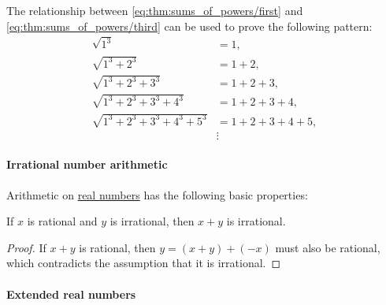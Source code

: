 \begin{example}\label{ex:sqrt_of_cubes}
  The relationship between \eqref{eq:thm:sums_of_powers/first} and \eqref{eq:thm:sums_of_powers/third} can be used to prove the following pattern:
  \begin{align*}
    \sqrt{ 1^3 }                               &= 1, \\
    \sqrt{ 1^3 + 2^3 }                         &= 1 + 2, \\
    \sqrt{ 1^3 + 2^3 + 3^3 }                   &= 1 + 2 + 3, \\
    \sqrt{ 1^3 + 2^3 + 3^3 + 4^3 }             &= 1 + 2 + 3 + 4, \\
    \sqrt{ 1^3 + 2^3 + 3^3 + 4^3 + 5^3 }       &= 1 + 2 + 3 + 4 + 5, \\
                                               &\vdots
  \end{align*}
\end{example}

\paragraph{Irrational number arithmetic}

\begin{proposition}\label{thm:real_number_arithmetic}
  Arithmetic on \hyperref[def:real_numbers]{real numbers} has the following basic properties:
  \begin{thmenum}
     If \( x \) is rational and \( y \) is irrational, then \( x + y \) is irrational.
  \end{thmenum}
\end{proposition}
\begin{proof}
   If \( x + y \) is rational, then \( y = (x + y) + (-x) \) must also be rational, which contradicts the assumption that it is irrational.
\end{proof}

\paragraph{Extended real numbers}

